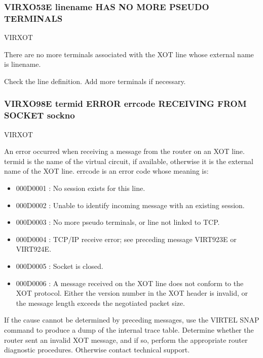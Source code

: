 \documentclass[letterpaper,10pt,english]{sphinxmanual}
\begin{document}
\subsubsection{VIRXO53E linename HAS NO MORE PSEUDO TERMINALS}
\label{\detokenize{messages:virxo53e-linename-has-no-more-pseudo-terminals}}\begin{description}
\sphinxAtStartPar
VIRXOT

\sphinxAtStartPar
There are no more terminals associated with the XOT line whose external name is linename.

\sphinxAtStartPar
Check the line definition. Add more terminals if necessary.

\end{description}


\subsubsection{VIRXO98E termid ERROR errcode RECEIVING FROM SOCKET sockno}
\label{\detokenize{messages:virxo98e-termid-error-errcode-receiving-from-socket-sockno}}\begin{description}
\sphinxAtStartPar
VIRXOT

\sphinxAtStartPar
An error occurred when receiving a message from the router on an XOT line. termid is the name of the virtual circuit, if available, otherwise it is the external name of the XOT line. errcode is an error code whose meaning is:
\begin{itemize}
\item {} 
\sphinxAtStartPar
000D0001 : No session exists for this line.

\item {} 
\sphinxAtStartPar
000D0002 : Unable to identify incoming message with an existing session.

\item {} 
\sphinxAtStartPar
000D0003 : No more pseudo terminals, or line not linked to TCP.

\item {} 
\sphinxAtStartPar
000D0004 : TCP/IP receive error; see preceding message VIRT923E or VIRT924E.

\item {} 
\sphinxAtStartPar
000D0005 : Socket is closed.

\item {} 
\sphinxAtStartPar
000D0006 : A message received on the XOT line does not conform to the XOT protocol. Either the version number in the XOT header is invalid, or the message length exceeds the negotiated packet size.

\end{itemize}

\sphinxAtStartPar
If the cause cannot be determined by preceding messages, use the VIRTEL SNAP command to produce a dump of the internal trace table. Determine whether the router sent an invalid XOT message, and if so, perform the appropriate router diagnostic procedures. Otherwise contact technical support.

\end{description}
\end{document}
